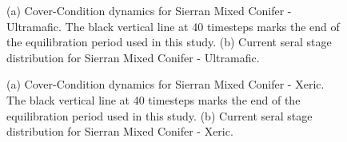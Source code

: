 \begin{figure}[!htbp]
  \centering
  \caption{(a) Cover-Condition dynamics for Sierran Mixed Conifer - Ultramafic. The black vertical line at 40 timesteps marks the end of the equilibration period used in this study. (b) Current seral stage distribution for Sierran Mixed Conifer - Ultramafic.} 
  \label{fig:covcond_smcu}
\end{figure}

\begin{figure}[!htbp]
  \centering
  \caption{(a) Cover-Condition dynamics for Sierran Mixed Conifer - Xeric. The black vertical line at 40 timesteps marks the end of the equilibration period used in this study. (b) Current seral stage distribution for Sierran Mixed Conifer - Xeric.} 
  \label{fig:covcond_smcx_app}
\end{figure}



